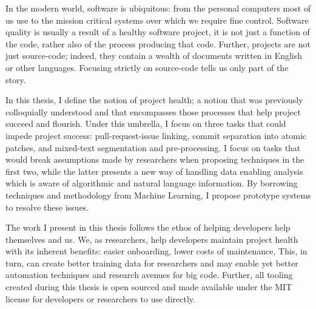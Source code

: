 In the modern world, software is ubiquitous: from the personal computers most of
us use to the mission critical systems over which we require fine control.
Software quality is usually a result of a healthy software project, \ie it is
not just a function of the code, rather also of the process producing that code.
Further, projects are not just source-code; indeed, they contain a wealth of
documents written in English or other languages. Focusing strictly on
source-code tells us only part of the story.

In this thesis, I define the notion of project health; a notion that was
previously colloquially understood and that encompasses those processes that
help project succeed and flourish. Under this umbrella, I focus on three tasks
that could impede project success: pull-request-issue linking, commit separation
into atomic patches, and mixed-text segmentation and pre-processing. I focus on
tasks that would break assumptions made by researchers when proposing techniques
in the first two, while the latter presents a new way of handling data enabling
analysis which is aware of algorithmic and natural language information. By
borrowing techniques and methodology from Machine Learning, I propose prototype
systems to resolve these issues.

The work I present in this thesis follows the ethos of helping developers help
themselves and us. We, as researchers, help developers maintain project health
with its inherent benefits: easier onboarding, lower costs of maintenance, \etc
This, in turn, can create better training data for researchers and may enable
yet better automation techniques and research avenues for big code. Further, all
tooling created during this thesis is open sourced and made available under the
MIT license for developers or researchers to use directly.